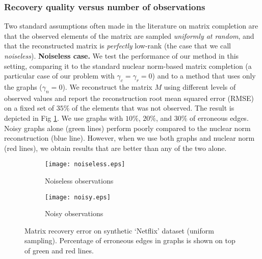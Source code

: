 \documentclass{article}
\begin{document}
\vspace{-0.1cm}
\subsubsection{Recovery quality versus number of observations}
\vspace{-0.25cm}
Two standard assumptions often made in the literature on matrix completion are that the observed elements of the matrix are sampled \textit{uniformly at random}, and that the reconstructed matrix is \textit{perfectly} low-rank (the case that we call \textit{noiseless}).
{\bf Noiseless case. } We test the performance of our method in this setting, comparing it to the standard nuclear norm-based matrix completion (a particular case of our problem with $\gamma_c = \gamma_r = 0$) and to a method that uses only the graphs ($\gamma_n = 0$). We reconstruct the matrix $M$ using different levels of observed values and report the reconstruction root mean squared error (RMSE) on a fixed set of $35\%$ of the elements that was not observed. The result is depicted in Fig \ref{fig:art_uniform_noiseless}. 
We use graphs with $10\%$, $20\%$, and $30\%$ of erroneous edges. 
Noisy graphs alone (green lines) perform poorly compared to the nuclear norm reconstruction (blue line). However, when we use both graphs and nuclear norm (red lines), we obtain results that are better than any of the two alone.\\
\begin{figure}
\label{fig:art_uniform_all}
          \begin{subfigure}[b]{.5\linewidth}
            \centering \texttt{[image: noiseless.eps]}
            \caption{Noiseless observations}\label{fig:art_uniform_noiseless}
          \end{subfigure}
          \begin{subfigure}[b]{.5\linewidth}
            \centering\texttt{[image: noisy.eps]}
            \caption{Noisy observations}\label{fig:art_uniform_noisy}
          \end{subfigure}
        \caption{Matrix recovery error on synthetic `Netflix' dataset (uniform sampling). Percentage of erroneous edges in graphs is shown on top of green and red lines. }
	\vspace{-0.45cm}
\end{figure}
\end{document}

